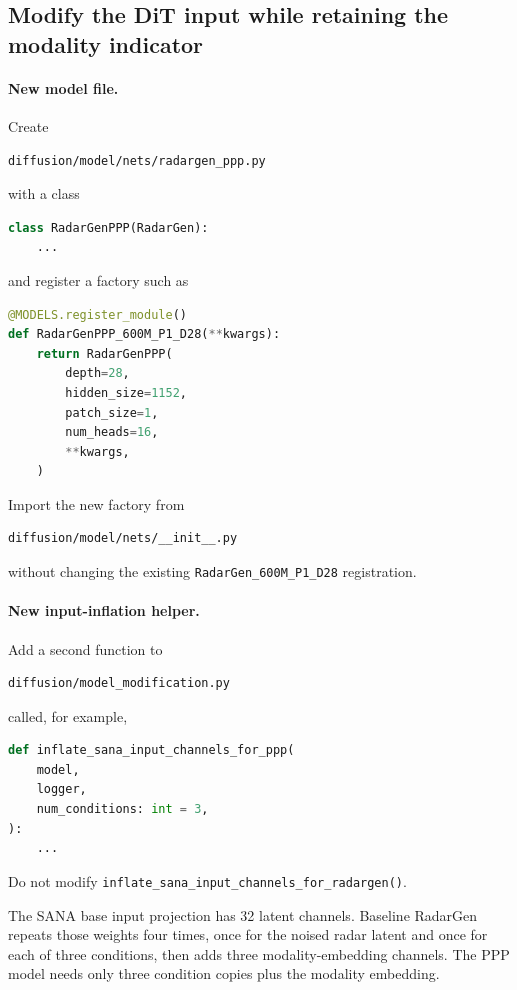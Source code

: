 \documentclass[11pt,a4paper]{article}
\begin{document}
\subsection{Modify the DiT input while retaining the modality indicator}

\paragraph{New model file.}
Create
\begin{lstlisting}
diffusion/model/nets/radargen_ppp.py
\end{lstlisting}
with a class
\begin{lstlisting}[language=Python]
class RadarGenPPP(RadarGen):
    ...
\end{lstlisting}
and register a factory such as
\begin{lstlisting}[language=Python]
@MODELS.register_module()
def RadarGenPPP_600M_P1_D28(**kwargs):
    return RadarGenPPP(
        depth=28,
        hidden_size=1152,
        patch_size=1,
        num_heads=16,
        **kwargs,
    )
\end{lstlisting}

Import the new factory from
\begin{lstlisting}
diffusion/model/nets/__init__.py
\end{lstlisting}
without changing the existing \texttt{RadarGen\_600M\_P1\_D28} registration.

\paragraph{New input-inflation helper.}
Add a second function to
\begin{lstlisting}
diffusion/model_modification.py
\end{lstlisting}
called, for example,
\begin{lstlisting}[language=Python]
def inflate_sana_input_channels_for_ppp(
    model,
    logger,
    num_conditions: int = 3,
):
    ...
\end{lstlisting}

Do not modify \texttt{inflate\_sana\_input\_channels\_for\_radargen()}.

The SANA base input projection has 32 latent channels. Baseline RadarGen repeats those weights four times, once for the noised radar latent and once for each of three conditions, then adds three modality-embedding channels. The PPP model needs only three condition copies plus the modality embedding.
\end{document}
